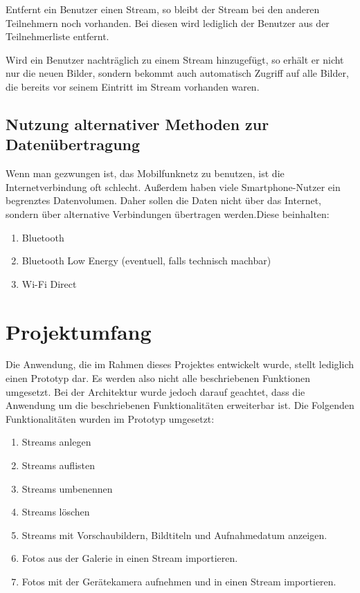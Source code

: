 Entfernt ein Benutzer einen Stream, so bleibt der Stream bei den anderen Teilnehmern noch vorhanden. Bei diesen wird lediglich der Benutzer aus der Teilnehmerliste entfernt.

Wird ein Benutzer nachträglich zu einem Stream hinzugefügt, so erhält er nicht nur die neuen Bilder, sondern bekommt auch automatisch Zugriff auf alle Bilder, die bereits vor seinem Eintritt im Stream vorhanden waren.

\subsection{Nutzung alternativer Methoden zur Datenübertragung}
Wenn man gezwungen ist, das Mobilfunknetz zu benutzen, ist die Internetverbindung oft schlecht. Außerdem haben viele Smartphone-Nutzer ein begrenztes Datenvolumen. Daher sollen die Daten nicht über das Internet, sondern über alternative Verbindungen übertragen werden.Diese beinhalten:

\begin{enumerate}
	\item Bluetooth
	\item Bluetooth Low Energy (eventuell, falls technisch machbar)
	\item Wi-Fi Direct
\end{enumerate}

\section{Projektumfang}

Die Anwendung, die im Rahmen dieses Projektes entwickelt wurde, stellt lediglich einen Prototyp dar. Es werden also nicht alle beschriebenen Funktionen umgesetzt. Bei der Architektur wurde jedoch darauf geachtet, dass die Anwendung um die beschriebenen Funktionalitäten erweiterbar ist. Die Folgenden Funktionalitäten wurden im Prototyp umgesetzt:

\begin{enumerate}
	\item Streams anlegen
	\item Streams auflisten
	\item Streams umbenennen
	\item Streams löschen
	\item Streams mit Vorschaubildern, Bildtiteln und Aufnahmedatum anzeigen.
	\item Fotos aus der Galerie in einen Stream importieren.
	\item Fotos mit der Gerätekamera aufnehmen und in einen Stream importieren.
\end{enumerate}
